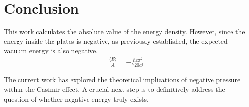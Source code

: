 \section{Conclusion}

This work calculates the absolute value of the energy density. 
However, since the energy inside the plates is negative, as previously established, 
the expected vacuum energy is also negative.
\begin{align}
    \frac{\langle E \rangle}{A} = -\frac{\hbar c \pi^2}{720 a^3}
\end{align}

The current work has explored the theoretical implications of negative pressure within the Casimir effect. 
A crucial next step is to definitively address the question of whether negative energy truly exists.
